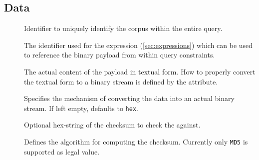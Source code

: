 \documentclass[11pt,a4paper]{article}
\begin{document}
\subsection{Data}
\label{sec:json-ld-data}
\begin{attributes}{}
\end{attributes}
\begin{description}
	\item[] Identifier to uniquely identify the corpus within the entire query.
	\item[] The identifier used for the expression (\ref{sec:expressions}) which can be used to reference the binary payload from within query constraints.
	\item[] The actual content of the payload in textual form. How to properly convert the textual form to a binary stream is defined by the  attribute.
	\item[] Specifies the mechanism of converting the  data into an actual binary stream. If left empty, defaults to \texttt{hex}.
	\item[] Optional hex-string of the checksum to check the  against.
	\item[] Defines the algorithm for computing the checksum. Currently only \texttt{MD5} is supported as legal value.
\end{description}

\end{document}

